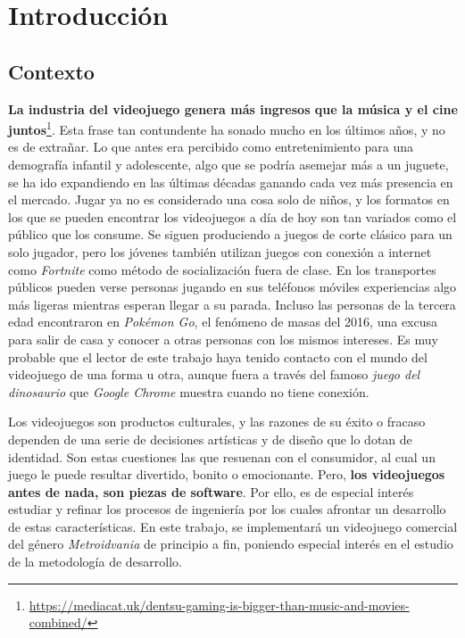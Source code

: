 \chapter{Introducción}

\section{Contexto}

\textbf{La industria del videojuego genera más ingresos que la música y el cine juntos}\footnote{\url{https://mediacat.uk/dentsu-gaming-is-bigger-than-music-and-movies-combined/}}. Esta frase tan contundente ha sonado mucho en los últimos años, y no es de extrañar. Lo que antes era percibido como entretenimiento para una demografía infantil y adolescente, algo que se podría asemejar más a un juguete, se ha ido expandiendo en las últimas décadas ganando cada vez más presencia en el mercado. Jugar ya no es considerado una cosa solo de niños, y los formatos en los que se pueden encontrar los videojuegos a día de hoy son tan variados como el público que los consume. Se siguen produciendo a juegos de corte clásico para un solo jugador, pero los jóvenes también utilizan juegos con conexión a internet como \textit{Fortnite} como método de socialización fuera de clase. En los transportes públicos pueden verse personas jugando en sus teléfonos móviles experiencias algo más ligeras mientras esperan llegar a su parada. Incluso las personas de la tercera edad encontraron en \textit{Pokémon Go}, el fenómeno de masas del 2016, una excusa para salir de casa y conocer a otras personas con los mismos intereses. Es muy probable que el lector de este trabajo haya tenido contacto con el mundo del videojuego de una forma u otra, aunque fuera a través del famoso \textit{juego del dinosaurio} que \textit{Google Chrome} muestra cuando no tiene conexión. 

Los videojuegos son productos culturales, y las razones de su éxito o fracaso dependen de una serie de decisiones artísticas y de diseño que lo dotan de identidad. Son estas cuestiones las que resuenan con el consumidor, al cual un juego le puede resultar divertido, bonito o emocionante. Pero, \textbf{los videojuegos antes de nada, son piezas de software}. Por ello, es de especial interés estudiar y refinar los procesos de ingeniería por los cuales afrontar un desarrollo de estas características. En este trabajo, se implementará un videojuego comercial del género \textit{Metroidvania} de principio a fin, poniendo especial interés en el estudio de la metodología de desarrollo.

